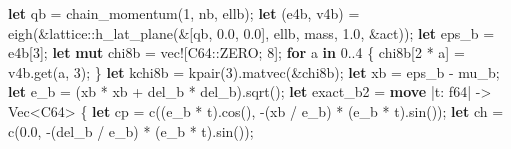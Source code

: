 \documentclass[
  10pt,
]{article}
\newenvironment{Shaded}{}{}
\newcommand{\ControlFlowTok}[1]{\textcolor[rgb]{0.00,0.44,0.13}{\textbf{#1}}}
\newcommand{\DataTypeTok}[1]{\textcolor[rgb]{0.56,0.13,0.00}{#1}}
\newcommand{\DecValTok}[1]{\textcolor[rgb]{0.25,0.63,0.44}{#1}}
\newcommand{\KeywordTok}[1]{\textcolor[rgb]{0.00,0.44,0.13}{\textbf{#1}}}
\newcommand{\NormalTok}[1]{#1}
\newcommand{\OperatorTok}[1]{\textcolor[rgb]{0.40,0.40,0.40}{#1}}
\newcommand{\PreprocessorTok}[1]{\textcolor[rgb]{0.74,0.48,0.00}{#1}}
\begin{document}
\begin{Shaded}
\begin{Highlighting}[]
    \KeywordTok{let}\NormalTok{ qb }\OperatorTok{=}\NormalTok{ chain\_momentum(}\DecValTok{1}\OperatorTok{,}\NormalTok{ nb}\OperatorTok{,}\NormalTok{ ellb)}\OperatorTok{;}
    \KeywordTok{let}\NormalTok{ (e4b}\OperatorTok{,}\NormalTok{ v4b) }\OperatorTok{=}\NormalTok{ eigh(}\OperatorTok{\&}\PreprocessorTok{lattice::}\NormalTok{h\_lat\_plane(}\OperatorTok{\&}\NormalTok{[qb}\OperatorTok{,} \DecValTok{0.0}\OperatorTok{,} \DecValTok{0.0}\NormalTok{]}\OperatorTok{,}\NormalTok{ ellb}\OperatorTok{,}\NormalTok{ mass}\OperatorTok{,} \DecValTok{1.0}\OperatorTok{,} \OperatorTok{\&}\NormalTok{act))}\OperatorTok{;}
    \KeywordTok{let}\NormalTok{ eps\_b }\OperatorTok{=}\NormalTok{ e4b[}\DecValTok{3}\NormalTok{]}\OperatorTok{;}
    \KeywordTok{let} \KeywordTok{mut}\NormalTok{ chi8b }\OperatorTok{=} \PreprocessorTok{vec!}\NormalTok{[}\PreprocessorTok{C64::}\NormalTok{ZERO}\OperatorTok{;} \DecValTok{8}\NormalTok{]}\OperatorTok{;}
    \ControlFlowTok{for}\NormalTok{ a }\KeywordTok{in} \DecValTok{0}\OperatorTok{..}\DecValTok{4} \OperatorTok{\{}
\NormalTok{        chi8b[}\DecValTok{2} \OperatorTok{*}\NormalTok{ a] }\OperatorTok{=}\NormalTok{ v4b}\OperatorTok{.}\NormalTok{get(a}\OperatorTok{,} \DecValTok{3}\NormalTok{)}\OperatorTok{;}
    \OperatorTok{\}}
    \KeywordTok{let}\NormalTok{ kchi8b }\OperatorTok{=}\NormalTok{ kpair(}\DecValTok{3}\NormalTok{)}\OperatorTok{.}\NormalTok{matvec(}\OperatorTok{\&}\NormalTok{chi8b)}\OperatorTok{;}
    \KeywordTok{let}\NormalTok{ xb }\OperatorTok{=}\NormalTok{ eps\_b }\OperatorTok{{-}}\NormalTok{ mu\_b}\OperatorTok{;}
    \KeywordTok{let}\NormalTok{ e\_b }\OperatorTok{=}\NormalTok{ (xb }\OperatorTok{*}\NormalTok{ xb }\OperatorTok{+}\NormalTok{ del\_b }\OperatorTok{*}\NormalTok{ del\_b)}\OperatorTok{.}\NormalTok{sqrt()}\OperatorTok{;}
    \KeywordTok{let}\NormalTok{ exact\_b2 }\OperatorTok{=} \KeywordTok{move} \OperatorTok{|}\NormalTok{t}\OperatorTok{:} \DataTypeTok{f64}\OperatorTok{|} \OperatorTok{{-}\textgreater{}} \DataTypeTok{Vec}\OperatorTok{\textless{}}\NormalTok{C64}\OperatorTok{\textgreater{}} \OperatorTok{\{}
        \KeywordTok{let}\NormalTok{ cp }\OperatorTok{=}\NormalTok{ c((e\_b }\OperatorTok{*}\NormalTok{ t)}\OperatorTok{.}\NormalTok{cos()}\OperatorTok{,} \OperatorTok{{-}}\NormalTok{(xb }\OperatorTok{/}\NormalTok{ e\_b) }\OperatorTok{*}\NormalTok{ (e\_b }\OperatorTok{*}\NormalTok{ t)}\OperatorTok{.}\NormalTok{sin())}\OperatorTok{;}
        \KeywordTok{let}\NormalTok{ ch }\OperatorTok{=}\NormalTok{ c(}\DecValTok{0.0}\OperatorTok{,} \OperatorTok{{-}}\NormalTok{(del\_b }\OperatorTok{/}\NormalTok{ e\_b) }\OperatorTok{*}\NormalTok{ (e\_b }\OperatorTok{*}\NormalTok{ t)}\OperatorTok{.}\NormalTok{sin())}\OperatorTok{;}

\end{Highlighting}
\end{Shaded}
\end{document}
